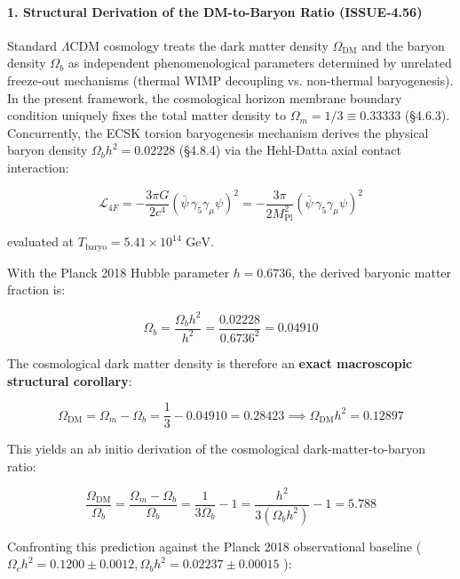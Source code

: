 \documentclass[11pt,a4paper]{article}
\theoremstyle{definition}\newtheorem{definition}{Definition}
\theoremstyle{remark}\newtheorem{remark}{Remark}
\begin{document}
\paragraph{1. Structural Derivation of the DM-to-Baryon Ratio (ISSUE-4.56)}

Standard $\Lambda\text{CDM}$ cosmology treats the dark matter density $\Omega_{\text{DM}}$ and the baryon density $\Omega_b$ as independent phenomenological parameters determined by unrelated freeze-out mechanisms (thermal WIMP decoupling vs. non-thermal baryogenesis). In the present framework, the cosmological horizon membrane boundary condition uniquely fixes the total matter density to $\Omega_m = 1/3 \equiv 0.33333$ (§4.6.3). Concurrently, the ECSK torsion baryogenesis mechanism derives the physical baryon density $\Omega_b h^2 = 0.02228$ (§4.8.4) via the Hehl-Datta axial contact interaction:


\begin{equation}
\mathcal{L}_{4F} = -\frac{3\pi G}{2c^4} (\bar{\psi} \, \gamma_5\gamma_\mu\psi)^2 = -\frac{3\pi}{2 M_{\text{Pl}}^2} (\bar{\psi} \, \gamma_5\gamma_\mu\psi)^2
\end{equation}


evaluated at $T_{\text{baryo}} = 5.41 \times 10^{14}\text{ GeV}$.

With the Planck 2018 Hubble parameter $h = 0.6736$, the derived baryonic matter fraction is:


\begin{equation}
\Omega_b = \frac{\Omega_b h^2}{h^2} = \frac{0.02228}{0.6736^2} = 0.04910
\end{equation}


The cosmological dark matter density is therefore an \textbf{exact macroscopic structural corollary}:


\begin{equation}
\Omega_{\text{DM}} = \Omega_m - \Omega_b = \frac{1}{3} - 0.04910 = 0.28423 \implies \Omega_{\text{DM}} h^2 = 0.12897
\end{equation}


This yields an ab initio derivation of the cosmological dark-matter-to-baryon ratio:


\begin{equation}
\frac{\Omega_{\text{DM}}}{\Omega_b} = \frac{\Omega_m - \Omega_b}{\Omega_b} = \frac{1}{3\Omega_b} - 1 = \frac{h^2}{3(\Omega_b h^2)} - 1 = \mathbf{5.788}
\end{equation}


Confronting this prediction against the Planck 2018 observational baseline ( $\Omega_c h^2 = 0.1200 \pm 0.0012, \Omega_b h^2 = 0.02237 \pm 0.00015$ ):
\end{document}
